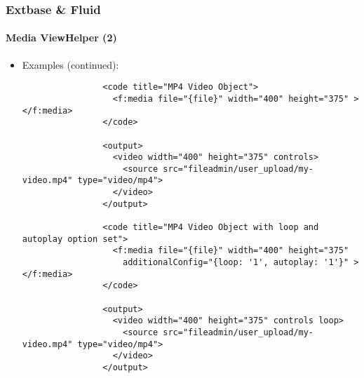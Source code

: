 
\begin{frame}[fragile]
	\frametitle{Extbase \& Fluid}
	\framesubtitle{Media ViewHelper (2)}

	\lstset{basicstyle=\tiny\ttfamily}

	\begin{itemize}

		\item Examples (continued):

			\begin{lstlisting}
				<code title="MP4 Video Object">
				  <f:media file="{file}" width="400" height="375" ></f:media>
				</code>

				<output>
				  <video width="400" height="375" controls>
				    <source src="fileadmin/user_upload/my-video.mp4" type="video/mp4">
				  </video>
				</output>

				<code title="MP4 Video Object with loop and autoplay option set">
				  <f:media file="{file}" width="400" height="375"
				    additionalConfig="{loop: '1', autoplay: '1'}" ></f:media>
				</code>

				<output>
				  <video width="400" height="375" controls loop>
				    <source src="fileadmin/user_upload/my-video.mp4" type="video/mp4">
				  </video>
				</output>
			\end{lstlisting}

	\end{itemize}

\end{frame}


